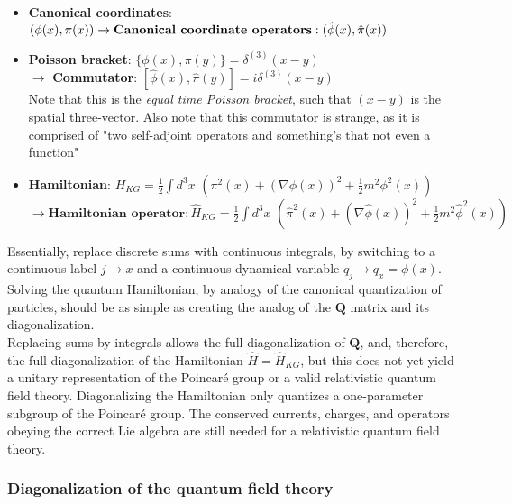 \begin{itemize}
\item \textbf{Canonical coordinates}: $(\phi(x), \pi(x)) \\ \rightarrow \textbf{Canonical coordinate operators}: (\hat{\phi}(x), \hat{\pi}(x))$ \\
\item \textbf{Poisson bracket}: $\{ \phi(x), \pi(y) \} = \delta^{(3)}(x-y)$ \\ $\rightarrow$ \textbf{Commutator}: $[\hat{\phi}(x), \hat{\pi}(y)] = i \delta^{(3)}(x-y)$ \\
	\subitem Note that this is the \textit{equal time Poisson bracket}, such that $(x-y)$ is the spatial three-vector.
	\subitem Also note that this commutator is strange,  as it is comprised of "two self-adjoint operators and something's that not even a function" \\
\item \textbf{Hamiltonian}: $H_{KG} = \frac{1}{2} \int d^3x \,\, \left( \pi^2(x) + (\nabla \phi(x))^2 + \frac{1}{2} m^2 \phi^2(x) \right)$ \\ $\rightarrow \textbf{Hamiltonian operator}: \hat{H}_{KG} = \frac{1}{2} \int d^3x \,\, \left( \hat{\pi}^2(x) + (\nabla \hat{\phi}(x))^2 + \frac{1}{2} m^2 \hat{\phi}^2(x) \right)$
\end{itemize}

\noindent Essentially, replace discrete sums with continuous integrals, by switching to a continuous label $j \rightarrow x$ and a continuous dynamical variable $q_j \rightarrow q_x=\phi(x)$. Solving the quantum Hamiltonian, by analogy of the canonical quantization of particles, should be as simple as creating the analog of the $\textbf{Q}$ matrix and its diagonalization. \\

\noindent  Replacing sums by integrals allows the full diagonalization of $\textbf{Q}$, and, therefore, the full diagonalization of the Hamiltonian $\hat{H} = \hat{H}_{KG}$, but this does not yet yield a unitary representation of the Poincar\'e group or a valid relativistic quantum field theory. Diagonalizing the Hamiltonian only quantizes a one-parameter subgroup of the Poincar\'e group. The conserved currents, charges, and operators obeying the correct Lie algebra are still needed for a relativistic quantum field theory. \\

\subsubsection*{Diagonalization of the quantum field theory}

